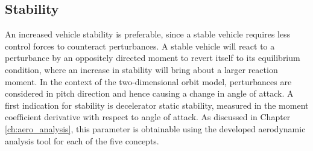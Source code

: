 \subsection{Stability}
An increased vehicle stability is preferable, since a stable vehicle requires less control forces to counteract perturbances. A stable vehicle will react to a perturbance by an oppositely directed moment to revert itself to its equilibrium condition, where an increase in stability will bring about a larger reaction moment. In the context of the two-dimensional orbit model, perturbances are considered in pitch direction and hence causing a change in angle of attack. A first indication for stability is decelerator static stability, measured in the moment coefficient derivative with respect to angle of attack. As discussed in Chapter \ref{ch:aero_analysis}, this parameter is obtainable using the developed aerodynamic analysis tool for each of the five concepts.




